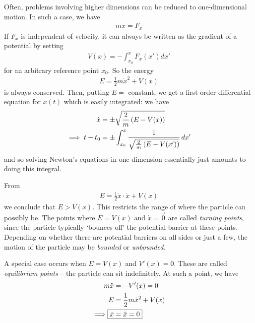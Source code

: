 \documentclass{../../template/note}
\begin{document}
    Often, problems involving higher dimensions can be reduced to one-dimensional motion. In such a case, we have
    \begin{align*}
        m \ddot x = F_x
    \end{align*}
    If \(F_x\) is independent of velocity, it can always be written as the gradient of a potential by setting
    \begin{align*}
        V(x) = -\int_{x_0}^x F_x(x') dx'
    \end{align*}
    for an arbitrary reference point \(x_0\). So the energy
    \begin{align*}
        E = \frac{1}{2} m \dot x^2 + V(x)
    \end{align*}
    is always conserved. Then, putting \(E = \) constant, we get a first-order differential equation for \(x(t)\) which is easily integrated: we have
    \begin{align*}
        \dot x &= \pm \sqrt{\frac 2 m \left(E - V(x)\right)} \\
        \implies t - t_0 &= \pm \int_{x_0}^x \frac{1}{\sqrt{\frac 2 m \left(E - V(x')\right)}} \,d{x}'
    \end{align*}
    and so solving Newton's equations in one dimension essentially just amounts to doing this integral.


    \noindent From
    \begin{align*}
        E = \frac{1}{2} \dot{x} \cdot \dot{x} + V(x)
    \end{align*}
    we conclude that \(E > V(x)\). This restricts the range of where the particle can possibly be. The points where \(E = V(x)\) and \(\dot{x} = \vec 0\) are called \emph{turning points}, since the particle typically `bounces off' the potential barrier at these points. Depending on whether there are potential barriers on all sides or just a few, the motion of the particle may be \emph{bounded} or \emph{unbounded}.

    A special case occurs when \(E = V(x)\) and \(V'(x) = 0\). These are called \emph{equilibrium points} -- the particle can sit indefinitely. At such a point, we have
    \begin{align*}
        m \ddot x &= -V'(x) = 0 \\
        E &= \frac 1 2 m \dot x^2 + V(x) \\
        \implies \Aboxed{\dot x &= \ddot x = 0}
    \end{align*}
    
\end{document}
